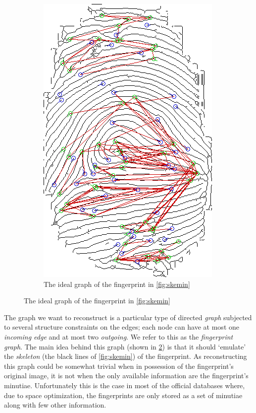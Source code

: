 \documentclass[8pt]{article}
\begin{document}
\begin{figure}
\begin{subfigure}{.48\textwidth}
	\includegraphics[width=.75\linewidth]{img/skemingraph}
	\caption{The ideal graph of the fingerprint in \cref{fig:skemin}}
	\label{fig:skemingraph}
	\end{subfigure}%
\end{figure}

The graph we want to reconstruct is a particular type of directed
\textit{graph} subjected to several structure constraints on the edges; \eg each
node can have at most one \textit{incoming edge} and at most two
\textit{outgoing}.  We refer to this as the \emph{fingerprint graph}.  The main
idea behind this graph (shown in \cref{fig:skemingraph}) is that it should
\textquoteleft emulate' the \textit{skeleton} (the black lines of
\cref{fig:skemin}) of the fingerprint.  As reconstructing this graph could be
somewhat trivial when in possession of the fingerprint's original image, it is not
when the only available information are the fingerprint's minutiae.
Unfortunately this is the case in most of the official databases where, due to
space optimization, the fingerprints are only stored as a set of minutiae along
with few other information.
    
\end{document}
